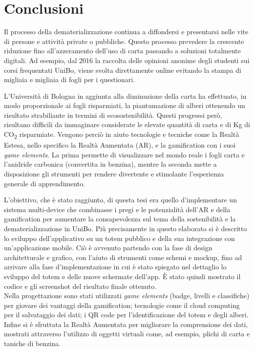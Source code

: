 \chapter{Conclusioni}

Il processo della dematerializzazione continua a diffondersi e presentarsi nelle vite di persone e attività private o pubbliche.
Questo processo prevedere la crescente riduzione fino all'azzeramento dell'uso di carta passando a soluzioni totalmente digitali. Ad esempio, dal 2016 la raccolta delle opinioni anonime degli studenti sui corsi frequentati UniBo, viene svolta direttamente online evitando la stampa di migliaia e migliaia di fogli per i questionari.
\vspace{\baselineskip}

L'Università di Bologna in aggiunta alla diminuzione della carta ha effettuato, in modo proporzionale ai fogli risparmiati, la piantumazione di alberi ottenendo un risultato strabiliante in termini di ecosostenibilità. Questi progressi però, risultano difficili da immaginare considerate le elevate quantità di carta e di Kg di CO\textsubscript{2} risparmiate.
Vengono perciò in aiuto tecnologie e tecniche come la Realtà Estesa, nello specifico la Realtà Aumentata (AR), e la gamification con i suoi \textit{game elements}. La prima permette di visualizzare nel mondo reale i fogli carta e l'anidride carbonica (convertita in benzina), mentre la seconda mette a disposizione gli strumenti per rendere divertente e stimolante l'esperienza generale di apprendimento.
\vspace{10pt}

L'obiettivo, che è stato raggiunto, di questa tesi era quello d'implementare un sistema multi-device che combinasse i pregi e le potenzialità dell'AR e della gamification per aumentare la consapevolezza sul tema della sostenibilità e la dematerializzazione in UniBo.
Più precisamente in questo elaborato si è descritto lo sviluppo dell'applicativo su un totem pubblico e della sua integrazione con un'applicazione mobile. Ciò è avvenuto partendo con la fase di design architetturale e grafico, con l'aiuto di strumenti come schemi e mockup, fino ad arrivare alla fase d'implementazione in cui è stato spiegato nel dettaglio lo sviluppo del totem e delle nuove schermate dell'app. \`E stato quindi mostrato il codice e gli screenshot del risultato finale ottenuto.
\vspace{\baselineskip}
\\
Nella progettazione sono stati utilizzati \textit{game elements} (badge, livelli e classifiche) per giovare dei vantaggi della gamification; tecnologie come il cloud computing per il salvataggio dei dati; i QR code per l'identificazione del totem e degli alberi. Infine si è sfruttata la Realtà Aumentata per migliorare la comprensione dei dati, mostrati attraverso l'utilizzo di oggetti virtuali come, ad esempio, plichi di carta e taniche di benzina.

